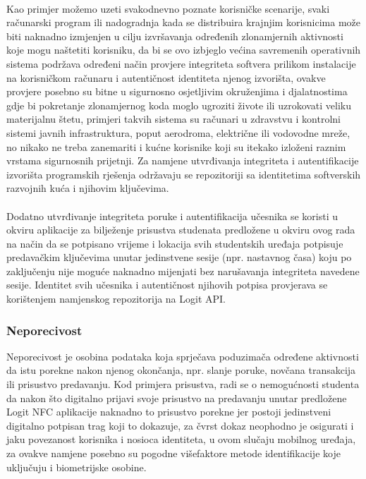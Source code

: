 \paragraph*{}
Kao primjer možemo uzeti svakodnevno poznate korisničke scenarije, svaki računarski program ili nadogradnja kada se distribuira krajnjim korisnicima može biti naknadno izmjenjen u cilju izvršavanja određenih zlonamjernih aktivnosti koje mogu naštetiti korisniku, da bi se ovo izbjeglo većina savremenih operativnih sistema podržava određeni način provjere integriteta softvera prilikom instalacije na korisničkom računaru i autentičnost identiteta njenog izvorišta, ovakve provjere posebno su bitne u sigurnosno osjetljivim okruženjima i djalatnostima gdje bi pokretanje zlonamjernog koda moglo ugroziti živote ili uzrokovati veliku materijalnu štetu, primjeri takvih sistema su računari u zdravstvu i kontrolni sistemi javnih infrastruktura, poput aerodroma, električne ili vodovodne mreže, no nikako ne treba zanemariti i kućne korisnike koji su itekako izloženi raznim vrstama sigurnosnih prijetnji. Za namjene utvrđivanja integriteta i autentifikacije izvorišta programskih rješenja održavaju se repozitoriji sa identitetima softverskih razvojnih kuća i njihovim ključevima.

\paragraph*{}
Dodatno utvrđivanje integriteta poruke i autentifikacija učesnika se koristi u okviru aplikacije za bilježenje prisustva studenata predložene u okviru ovog rada na način da se potpisano vrijeme i lokacija svih studentskih uređaja potpisuje predavačkim ključevima unutar jedinstvene sesije (npr. nastavnog časa) koju po zaključenju nije moguće naknadno mijenjati bez narušavanja integriteta navedene sesije. Identitet svih učesnika i autentičnost njihovih potpisa provjerava se korištenjem namjenskog repozitorija na Logit API.

\subsubsection*{Neporecivost}
Neporecivost je osobina podataka koja sprječava poduzimača određene aktivnosti da istu porekne nakon njenog okončanja, npr. slanje poruke, novčana transakcija ili prisustvo predavanju. Kod primjera prisustva, radi se o nemogućnosti studenta da nakon što digitalno prijavi svoje prisustvo na predavanju unutar predložene Logit NFC aplikacije naknadno to prisustvo porekne jer postoji jedinstveni digitalno potpisan trag koji to dokazuje, za čvrst dokaz neophodno je osigurati i jaku povezanost korisnika i nosioca identiteta, u ovom slučaju mobilnog uređaja, za ovakve namjene posebno su pogodne višefaktore metode identifikacije koje uključuju i biometrijske osobine.

